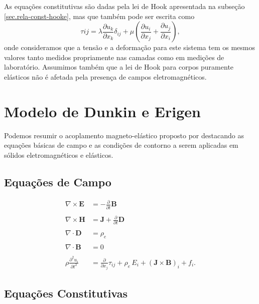 As equa\c{c}\~oes constitutivas s\~ao dadas pela lei de Hook apresentada na subse\c{c}\~ao \ref{sec.rela-const-hooke}, mas que tamb\'em pode ser escrita como
\begin{equation}
\tau{ij}=\lambda\frac{\partial u_k}{\partial x_k}\delta_{ij}+\mu\left(\frac{\partial u_i}{\partial x_j}+\frac{\partial u_j}{\partial x_i}\right),
\end{equation}
onde consideramos que a tens\~ao e a deforma\c{c}\~ao para  este sistema tem os mesmos valores tanto medidos propriamente nas camadas como em medi\c{c}\~oes de laborat\'orio. Assumimos tamb\'em que a lei de Hook para corpos puramente el\'asticos n\~ao \'e afetada pela presen\c{c}a de campos eletromagn\'eticos. 


\section{Modelo de Dunkin e Erigen}

Podemos resumir o acoplamento magneto-el\'astico proposto por \cite{erigen_1963} destacando as equa\c{c}\~oes b\'asicas de campo e as condi\c{c}\~oes de contorno a serem aplicadas em s\'olidos eletromagn\'eticos e el\'asticos.

\subsection{Equa\c{c}\~oes de Campo}

\begin{align}\label{eq.campo_dunkin_1}
\nabla\times\mathbf{E}&=-\frac{\partial}{\partial t}\mathbf{B}\\\nonumber\\\label{eq.campo_dunkin_2}
\nabla\times\mathbf{H}&=\mathbf{J}+\frac{\partial}{\partial t}\mathbf{D}\\\nonumber\\\label{eq.campo_dunkin_3}
\nabla\cdot\mathbf{D}&=\rho_e\\\nonumber\\\label{eq.campo_dunkin_4}
\nabla\cdot\mathbf{B}&=0\\\nonumber\\\label{eq.campo_dunkin_5}
\rho\frac{\partial^2 u_i}{\partial t^2}&=\frac{\partial}{\partial x_j}\tau_{ij}+\rho_e\,E_i+(\mathbf{J}\times\mathbf{B})_i+f_i.
\end{align}

\subsection{Equa\c{c}\~oes Constitutivas}\label{sec.constitutivas_dunkin}

